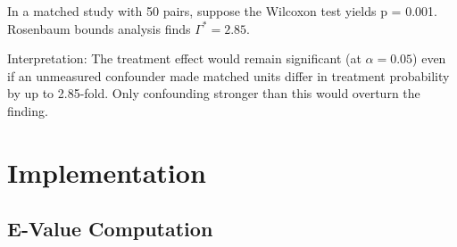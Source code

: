 \begin{example}
In a matched study with 50 pairs, suppose the Wilcoxon test yields p = 0.001. Rosenbaum bounds analysis finds $\Gamma^* = 2.85$.

Interpretation: The treatment effect would remain significant (at $\alpha = 0.05$) even if an unmeasured confounder made matched units differ in treatment probability by up to 2.85-fold. Only confounding stronger than this would overturn the finding.
\end{example}

\section{Implementation}
\label{sec:sens_implementation}

\subsection{E-Value Computation}

